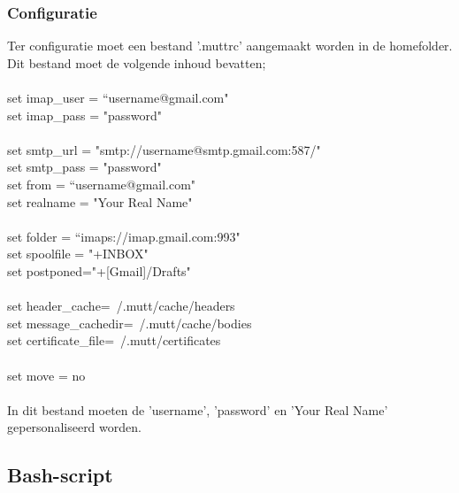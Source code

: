 \documentclass[12pt]{article}
\begin{document}
				\subsubsection{Configuratie}
					Ter configuratie moet een bestand '.muttrc' aangemaakt worden in de homefolder.\\
					Dit bestand moet de volgende inhoud bevatten;\\
						\\
						set imap\_user = \textquotedblleft username@gmail.com"\\
						set imap\_pass = "password"\\
						\\
						set smtp\_url = "smtp://username@smtp.gmail.com:587/"\\
						set smtp\_pass = "password"\\
						set from = \textquotedblleft username@gmail.com"\\
						set realname = "Your Real Name"\\
						\\
						set folder = \textquotedblleft imaps://imap.gmail.com:993"\\
						set spoolfile = "+INBOX"\\
						set postponed="+[Gmail]/Drafts"\\
						\\
						set header\_cache=~/.mutt/cache/headers\\
						set message\_cachedir=~/.mutt/cache/bodies\\
						set certificate\_file=~/.mutt/certificates\\
						\\
						set move = no\\
						\\
					In dit bestand moeten de 'username', 'password' en 'Your Real Name' gepersonaliseerd worden.\\
			\cite{Mail}
					
			\subsection{Bash-script}\label{Script}
				
\end{document}
